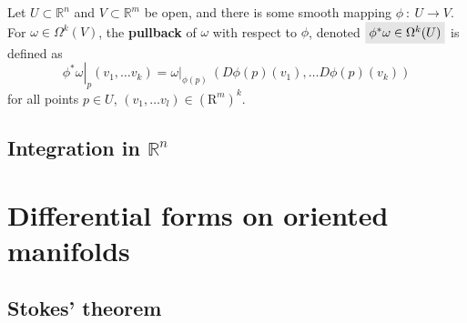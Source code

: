 \documentclass[letter-paper]{tufte-book}
\newcommand{\highlight}[1]{\mathchoice%
  {\colorbox{black!10}{$\displaystyle#1$}}%
  {\colorbox{black!10}{$\textstyle#1$}}%
  {\colorbox{black!10}{$\scriptstyle#1$}}%
  {\colorbox{black!10}{$\scriptscriptstyle#1$}}}%
\begin{document}
Let $U \subset \mathbb{R}^n$ and $V \subset \mathbb{R}^m$ be open, and there is some smooth mapping $\phi\ :\ U \to V$. For $\omega \in \Omega^k(V)$, the \textbf{pullback} of $\omega$ with respect to $\phi$, denoted $\highlight{\phi^* \omega \in \Omega^k(U)}$ is defined as
\begin{equation}
  \left.\phi^* \omega \right|_p (v_1, \ldots v_k) = \left.\omega\right|_{\phi(p)}\ (D\phi(p)(v_1), \ldots D\phi(p)(v_k))
\end{equation}
for all points $p\in U$, $(v_1, \ldots v_l) \in (\mathrm{R}^m)^k$.


\section{Integration in $\mathbb{R}^n$}


\chapter{Differential forms on oriented manifolds}


\section{Stokes' theorem}








\mainmatter




%


\end{document}
